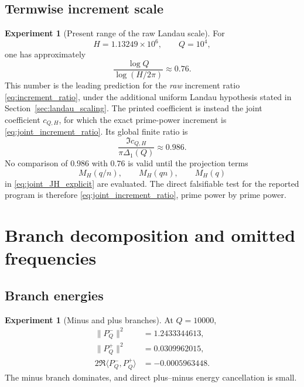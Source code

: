 \documentclass[11pt]{amsart}
\numberwithin{equation}{section}
\theoremstyle{plain}
\theoremstyle{definition}
\newtheorem{experiment}[theorem]{Experiment}
\theoremstyle{remark}
\newcommand{\1}{\mathbf{1}}
\begin{document}
\subsection{Termwise increment scale}
\label{subsec:numerical_increment_scale}

\begin{experiment}[Present range of the raw Landau scale]
\label{exp:numerical_landau_ratio}
For
\begin{equation}
H=1.13249\times10^6,
\qquad Q=10^4,
\label{eq:numerical_H_Q_pair}
\end{equation}
one has approximately
\begin{equation}
\frac{\log Q}{\log(H/2\pi)}\approx0.76.
\label{eq:numerical_log_ratio}
\end{equation}
This number is the leading prediction for the \emph{raw} increment ratio
\eqref{eq:increment_ratio}, under the additional uniform Landau
hypothesis stated in Section~\ref{sec:landau_scaling}.  The printed
coefficient is instead the joint coefficient \(c_{Q,H}\), for which the
exact prime-power increment is \eqref{eq:joint_increment_ratio}.  Its
global finite ratio is
\begin{equation}
\frac{\Im c_{Q,H}}{\pi\Delta_1(Q)}\approx0.986.
\label{eq:numerical_global_ratio_again}
\end{equation}
No comparison of \(0.986\) with \(0.76\) is valid until the projection
terms
\[
M_H(q/n),\qquad M_H(qn),\qquad M_H(q)
\]
in \eqref{eq:joint_JH_explicit} are evaluated.  The direct falsifiable
test for the reported program is therefore
\eqref{eq:joint_increment_ratio}, prime power by prime power.
\end{experiment}

\section{Branch decomposition and omitted frequencies}
\label{sec:numerical_branches_omitted}

\subsection{Branch energies}
\label{subsec:numerical_branch_energies}

\begin{experiment}[Minus and plus branches]
\label{exp:numerical_branch_energy_detailed}
At $Q=10000$,
\begin{align}
\|P_Q^-\|^2
&=1.2433344613,
\label{eq:numerical_minus_energy_detailed}
\\
\|P_Q^+\|^2
&=0.0309962015,
\label{eq:numerical_plus_energy_detailed}
\\
2\Re\langle P_Q^-,P_Q^+\rangle
&=-0.0005963448.
\label{eq:numerical_cross_energy_detailed}
\end{align}
The minus branch dominates, and direct plus--minus energy cancellation is
small.
\end{experiment}
\end{document}
